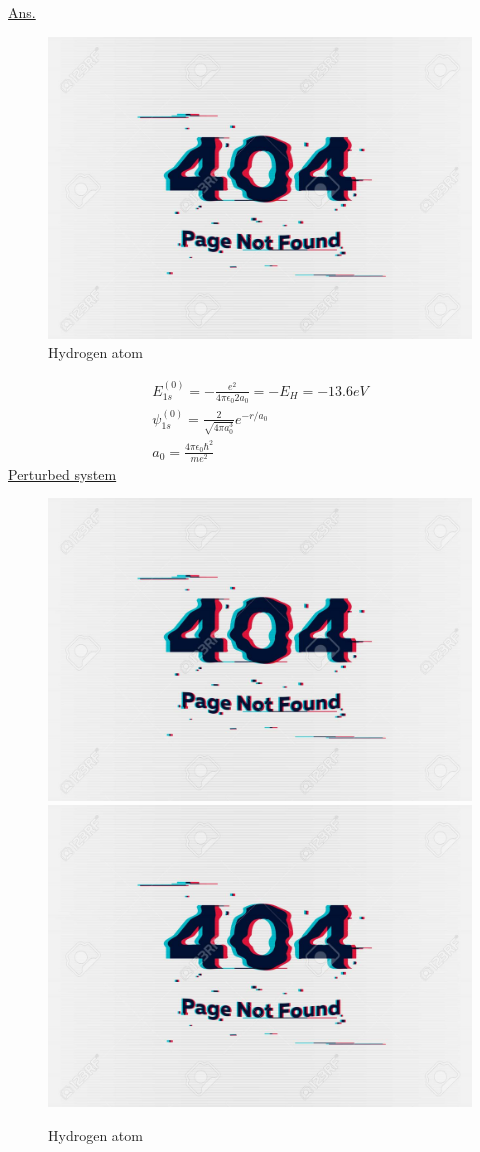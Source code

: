 \begin{enumerate}[label=Problem.\arabic*,start=1]
			\underline{Ans.}
			
			
			
			\begin{figure}
				\centering
				\includegraphics[width=0.5\linewidth]{Pictures/not-found.jpg}
				\caption{Hydrogen atom}
			\end{figure}
		
			\begin{align*}
				E_{1 s}^{(0)} = -\frac{e^2}{4\pi \epsilon_0 2 a_0} = - E_H = - 13.6 eV \\
				\psi_{1 s}^{(0)} = \frac{2}{\sqrt{4 \pi a_0^3} } e^{-r/a_0}\\
				a_0 = \frac{4 \pi \epsilon_0 \hbar^2}{m e^2}
			\end{align*}
			\underline{Perturbed system}
			
			\begin{figure}
				\centering
				\includegraphics[width=0.5\linewidth]{Pictures/not-found.jpg}
				\includegraphics[width=0.5\linewidth]{Pictures/not-found.jpg}
				\caption{Hydrogen atom}
			\end{figure}
		

\end{enumerate}
